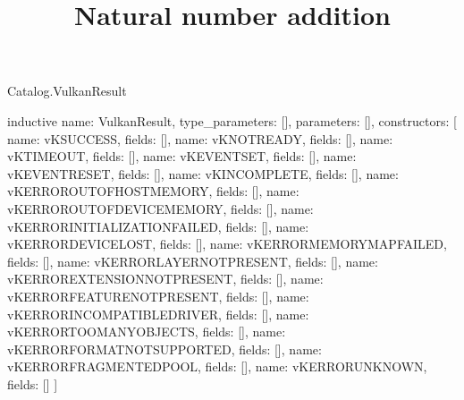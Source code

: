 \begin{lexlean}{Catalog.VulkanResult}
\title{Natural number addition}
\begin{semanticmodule}
inductive{
  name: VulkanResult,
  type_parameters: [],
  parameters: [],
  constructors: [
    {name: vKSUCCESS, fields: []},
    {name: vKNOTREADY, fields: []},
    {name: vKTIMEOUT, fields: []},
    {name: vKEVENTSET, fields: []},
    {name: vKEVENTRESET, fields: []},
    {name: vKINCOMPLETE, fields: []},
    {name: vKERROROUTOFHOSTMEMORY, fields: []},
    {name: vKERROROUTOFDEVICEMEMORY, fields: []},
    {name: vKERRORINITIALIZATIONFAILED, fields: []},
    {name: vKERRORDEVICELOST, fields: []},
    {name: vKERRORMEMORYMAPFAILED, fields: []},
    {name: vKERRORLAYERNOTPRESENT, fields: []},
    {name: vKERROREXTENSIONNOTPRESENT, fields: []},
    {name: vKERRORFEATURENOTPRESENT, fields: []},
    {name: vKERRORINCOMPATIBLEDRIVER, fields: []},
    {name: vKERRORTOOMANYOBJECTS, fields: []},
    {name: vKERRORFORMATNOTSUPPORTED, fields: []},
    {name: vKERRORFRAGMENTEDPOOL, fields: []},
    {name: vKERRORUNKNOWN, fields: []}
  ]
}
\end{semanticmodule}
\end{lexlean}
